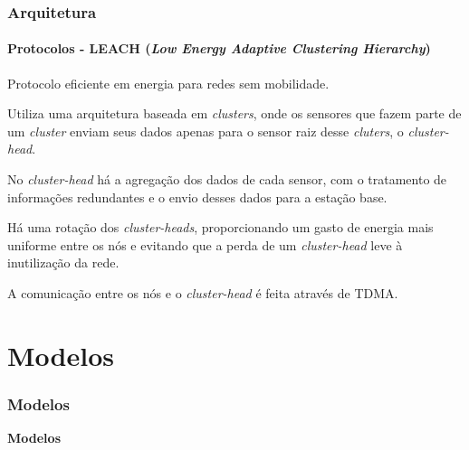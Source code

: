 \documentclass[notes]{beamer}
\begin{document}
\begin{frame}
\frametitle{Arquitetura}
\framesubtitle{Protocolos - LEACH (\textit{Low Energy Adaptive Clustering Hierarchy})}

\begin{block}

Protocolo eficiente em energia para redes sem mobilidade.

\end{block} \pause

\begin{block}

Utiliza uma arquitetura baseada em \textit{clusters}, onde os sensores que fazem parte de um \textit{cluster} enviam seus dados apenas para o sensor raiz desse \textit{cluters}, o \textit{cluster-head}. 

\end{block} \pause

\begin{block}

No \textit{cluster-head} há a agregação dos dados de cada sensor, com o tratamento de informações redundantes e o envio desses dados para a estação base.

\end{block} \pause

\begin{block}

Há uma rotação dos \textit{cluster-heads}, proporcionando um gasto de energia mais uniforme entre os nós e evitando que a perda de um \textit{cluster-head} leve à inutilização da rede.

\end{block}

\begin{block}

A comunicação entre os nós e o \textit{cluster-head} é feita através de TDMA.

\end{block}

\end{frame}

\section{Modelos}

\begin{frame}
\frametitle{Modelos}

\begin{block}

 \center \textbf{Modelos}

\end{block}

\end{frame}
\end{document}
